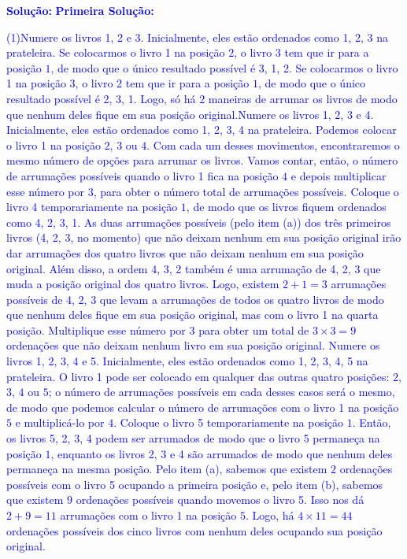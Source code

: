 \documentclass[oneside,a4paper,12pt]{article}
\newcommand{\negrito}[1]{\mbox{\boldmath{$#1$}}}
\theoremstyle{Colorido}
\theoremstyle{solu}
\theoremstyle{dotlessP}
\newcommand{\solucao}[1]{\textcolor{blue}{\textbf{Solução:} #1}}
\begin{document}
\solucao{\textbf{Primeira Solução:}\begin{tasks}[counter-format={(tsk[a])},label-width=3.6ex, label-format = {\bfseries}, column-sep = {20pt}](1)\task[\textcolor{blue}{$\negrito{(a)} $}] Numere os livros 1, 2 e 3. Inicialmente, eles estão ordenados como 1, 2, 3 na prateleira. Se colocarmos o livro 1 na posição $2$, o livro 3 tem que ir para a posição $1$, de modo que o único resultado possível é 3, 1, 2. Se colocarmos o livro 1 na posição $3$, o livro 2 tem que ir para a posição $1$, de modo que o único resultado possível é 2, 3, 1. Logo, só há $2$ maneiras de arrumar os livros de modo que nenhum deles fique em sua posição original.\task[\textcolor{blue}{$\negrito{(b)} $}] Numere os livros 1, 2, 3 e 4. Inicialmente, eles estão ordenados como 1, 2, 3, 4 na prateleira. Podemos colocar o livro 1 na posição $2$, $3$ ou $4$. Com cada um desses movimentos, encontraremos o mesmo número de opções para arrumar os livros. Vamos contar, então, o número de arrumações possíveis quando o livro 1 fica na posição $4$ e depois multiplicar esse número por $3$, para obter o número total de arrumações possíveis. Coloque o livro 4 temporariamente na posição $1$, de modo que os livros fiquem ordenados como 4, 2, 3, 1. As duas arrumações possíveis (pelo item (a)) dos três primeiros livros (4, 2, 3, no momento) que não deixam nenhum em sua posição original irão dar arrumações dos quatro livros que não deixam nenhum em sua posição original. Além disso, a ordem 4, 3, 2 também é uma arrumação de 4, 2, 3 que muda a posição original dos quatro livros. Logo, existem $2+1=3$ arrumações possíveis de 4, 2, 3 que levam a arrumações de todos os quatro livros de modo que nenhum deles fique em sua posição original, mas com o livro 1 na quarta posição. Multiplique esse número por $3$ para obter um total de $3\times3=9$ ordenações que não deixam nenhum livro em sua posição original.
\task[\textcolor{blue}{$\negrito{(c)} $}] Numere os livros 1, 2, 3, 4 e 5. Inicialmente, eles estão ordenados como 1, 2, 3, 4, 5 na prateleira. O livro 1 pode ser colocado em qualquer das outras quatro posições: $2$, $3$, $4$ ou $5$; o número de arrumações possíveis em cada desses casos será o mesmo, de modo que podemos calcular o número de arrumações com o livro 1 na posição $5$ e multiplicá-lo por $4$. Coloque o livro 5 temporariamente na posição $1$. Então, os livros 5, 2, 3, 4 podem ser arrumados de modo que o livro 5 permaneça na posição $1$, enquanto os livros 2, 3 e 4 são arrumados de modo que nenhum deles permaneça na mesma posição. Pelo item (a), sabemos que existem $2$ ordenações possíveis com o livro 5 ocupando a primeira posição e, pelo item (b), sabemos que existem $9$ ordenações possíveis quando movemos o livro 5. Isso nos dá $2+9=11$ arrumações com o livro 1 na posição $5$. Logo, há $4\times11=44$ ordenações possíveis dos cinco livros com nenhum deles ocupando sua posição original.

\end{tasks}}
\end{document}
